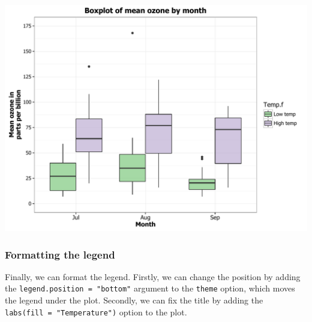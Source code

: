 \documentclass[]{article}
\begin{document}
\begin{center}\includegraphics{0_all_posts_pdf/box_17-1} \end{center}

\subsubsection{Formatting the legend}\label{formatting-the-legend-3}

Finally, we can format the legend. Firstly, we can change the position
by adding the \texttt{legend.position\ =\ "bottom"} argument to the
\texttt{theme} option, which moves the legend under the plot. Secondly,
we can fix the title by adding the \texttt{labs(fill\ =\ "Temperature")}
option to the plot.
\end{document}
